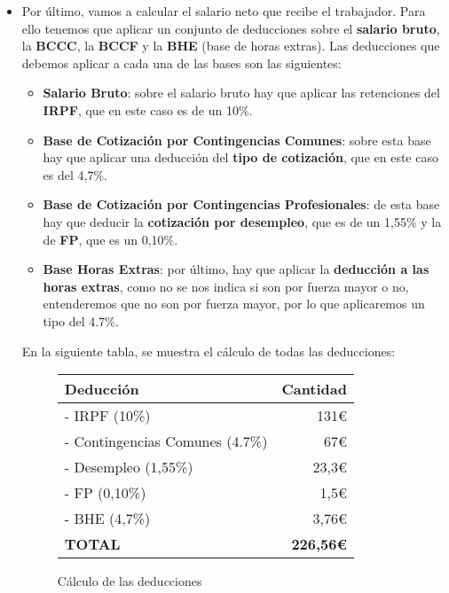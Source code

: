 \begin{itemize}
    \item Por último, vamos a calcular el salario neto que recibe el trabajador. Para ello tenemos que aplicar un conjunto de deducciones sobre el \textbf{salario bruto}, la \textbf{BCCC}, la \textbf{BCCF} y la \textbf{BHE} (base de horas extras). Las deducciones que debemos aplicar a cada una de las bases son las siguientes:

    \begin{itemize}
        \item \textbf{Salario Bruto}: sobre el salario bruto hay que aplicar las retenciones del \textbf{IRPF}, que en este caso es de un 10\%.
        \item \textbf{Base de Cotización por Contingencias Comunes}: sobre esta base hay que aplicar una deducción del \textbf{tipo de cotización}, que en este caso es del 4,7\%.
        \item \textbf{Base de Cotización por Contingencias Profesionales}: de esta base hay que deducir la \textbf{cotización por desempleo}, que es de un 1,55\% y la de \textbf{FP}, que es un 0,10\%.
        \item \textbf{Base Horas Extras}: por último, hay que aplicar la \textbf{deducción a las horas extras}, como no se nos indica si son por fuerza mayor o no, entenderemos que no son por fuerza mayor, por lo que aplicaremos un tipo del 4.7\%.
    \end{itemize}

    En la siguiente tabla, se muestra el cálculo de todas las deducciones:

      \begin{figure}[H]

        \vspace{3ex}
        \centering

        \setlength{\tabcolsep}{10pt}
        \renewcommand{\arraystretch}{1.4}

        \begin{tabular}{| l | r |}
            \hline
            \textbf{Deducción}  & \textbf{Cantidad} \\ \hline
            \centering - IRPF (10\%) &  131€ \\ \hline
            \centering - Contingencias Comunes (4.7\%) & 67€ \\ \hline
            \centering - Desempleo (1,55\%) & 23,3€  \\ \hline
            \centering - FP (0,10\%)& 1,5€ \\ \hline
            \centering - BHE (4,7\%) & 3,76€  \\ \hline
            \centering \textbf{TOTAL} &  \textbf{226,56€} \\ \hline
        \end{tabular}
        \caption{Cálculo de las deducciones}
    \end{figure}


\end{itemize}
